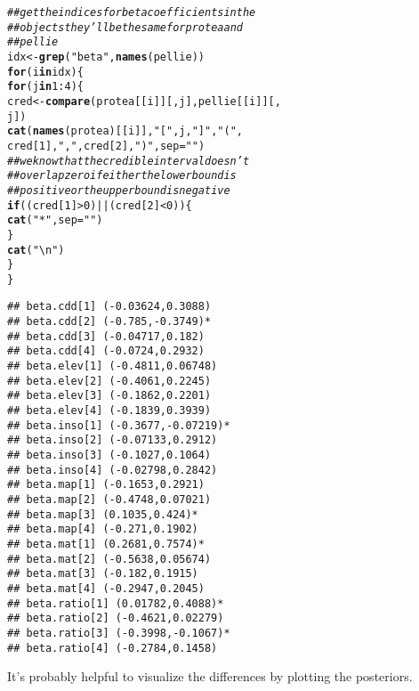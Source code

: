\documentclass[12pt]{article}\usepackage[]{graphicx}\usepackage[]{color}
\makeatletter
\newcommand{\hlnum}[1]{\textcolor[rgb]{0.686,0.059,0.569}{#1}}%
\newcommand{\hlstr}[1]{\textcolor[rgb]{0.192,0.494,0.8}{#1}}%
\newcommand{\hlcom}[1]{\textcolor[rgb]{0.678,0.584,0.686}{\textit{#1}}}%
\newcommand{\hlopt}[1]{\textcolor[rgb]{0,0,0}{#1}}%
\newcommand{\hlstd}[1]{\textcolor[rgb]{0.345,0.345,0.345}{#1}}%
\newcommand{\hlkwa}[1]{\textcolor[rgb]{0.161,0.373,0.58}{\textbf{#1}}}%
\newcommand{\hlkwb}[1]{\textcolor[rgb]{0.69,0.353,0.396}{#1}}%
\newcommand{\hlkwc}[1]{\textcolor[rgb]{0.333,0.667,0.333}{#1}}%
\newcommand{\hlkwd}[1]{\textcolor[rgb]{0.737,0.353,0.396}{\textbf{#1}}}%
\newenvironment{kframe}{%
 \def\at@end@of@kframe{}%
 \ifinner\ifhmode%
  \def\at@end@of@kframe{\end{minipage}}%
  \begin{minipage}{\columnwidth}%
 \fi\fi%
 \def\FrameCommand##1{\hskip\@totalleftmargin \hskip-\fboxsep
 \colorbox{shadecolor}{##1}\hskip-\fboxsep
     \hskip-\linewidth \hskip-\@totalleftmargin \hskip\columnwidth}%
 \MakeFramed {\advance\hsize-\width
   \@totalleftmargin\z@ \linewidth\hsize
   \@setminipage}}%
 {\par\unskip\endMakeFramed%
 \at@end@of@kframe}
\newenvironment{knitrout}{}{} %
\makeatother
\begin{document}
\begin{knitrout}
\color{fgcolor}\begin{kframe}
\begin{alltt}
\hlcom{## get the indices for beta coefficients in the}
\hlcom{## objects they'll be the same for protea and}
\hlcom{## pellie}
\hlstd{idx} \hlkwb{<-} \hlkwd{grep}\hlstd{(}\hlstr{"beta"}\hlstd{,} \hlkwd{names}\hlstd{(pellie))}
\hlkwa{for} \hlstd{(i} \hlkwa{in} \hlstd{idx) \{}
  \hlkwa{for} \hlstd{(j} \hlkwa{in} \hlnum{1}\hlopt{:}\hlnum{4}\hlstd{) \{}
    \hlstd{cred} \hlkwb{<-} \hlkwd{compare}\hlstd{(protea[[i]][, j], pellie[[i]][,}
      \hlstd{j])}
    \hlkwd{cat}\hlstd{(}\hlkwd{names}\hlstd{(protea)[[i]],} \hlstr{"["}\hlstd{, j,} \hlstr{"]"}\hlstd{,} \hlstr{" ("}\hlstd{,}
      \hlstd{cred[}\hlnum{1}\hlstd{],} \hlstr{","}\hlstd{, cred[}\hlnum{2}\hlstd{],} \hlstr{")"}\hlstd{,} \hlkwc{sep} \hlstd{=} \hlstr{""}\hlstd{)}
    \hlcom{## we know that the credible interval doesn't}
    \hlcom{## overlap zero if either the lower bound is}
    \hlcom{## positive or the upper bound is negative}
    \hlkwa{if} \hlstd{((cred[}\hlnum{1}\hlstd{]} \hlopt{>} \hlnum{0}\hlstd{)} \hlopt{||} \hlstd{(cred[}\hlnum{2}\hlstd{]} \hlopt{<} \hlnum{0}\hlstd{)) \{}
      \hlkwd{cat}\hlstd{(}\hlstr{"*"}\hlstd{,} \hlkwc{sep} \hlstd{=} \hlstr{""}\hlstd{)}
    \hlstd{\}}
    \hlkwd{cat}\hlstd{(}\hlstr{"\textbackslash{}n"}\hlstd{)}
  \hlstd{\}}
\hlstd{\}}
\end{alltt}
\begin{verbatim}
## beta.cdd[1] (-0.03624,0.3088)
## beta.cdd[2] (-0.785,-0.3749)*
## beta.cdd[3] (-0.04717,0.182)
## beta.cdd[4] (-0.0724,0.2932)
## beta.elev[1] (-0.4811,0.06748)
## beta.elev[2] (-0.4061,0.2245)
## beta.elev[3] (-0.1862,0.2201)
## beta.elev[4] (-0.1839,0.3939)
## beta.inso[1] (-0.3677,-0.07219)*
## beta.inso[2] (-0.07133,0.2912)
## beta.inso[3] (-0.1027,0.1064)
## beta.inso[4] (-0.02798,0.2842)
## beta.map[1] (-0.1653,0.2921)
## beta.map[2] (-0.4748,0.07021)
## beta.map[3] (0.1035,0.424)*
## beta.map[4] (-0.271,0.1902)
## beta.mat[1] (0.2681,0.7574)*
## beta.mat[2] (-0.5638,0.05674)
## beta.mat[3] (-0.182,0.1915)
## beta.mat[4] (-0.2947,0.2045)
## beta.ratio[1] (0.01782,0.4088)*
## beta.ratio[2] (-0.4621,0.02279)
## beta.ratio[3] (-0.3998,-0.1067)*
## beta.ratio[4] (-0.2784,0.1458)
\end{verbatim}
\end{kframe}
\end{knitrout}


It's probably helpful to visualize the differences by plotting the
posteriors.
\end{document}
